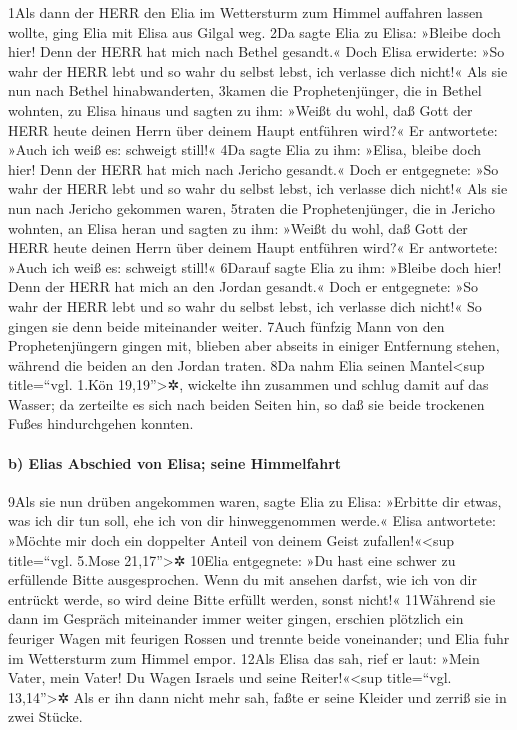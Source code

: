 1Als dann der HERR den Elia im Wettersturm zum Himmel auffahren lassen
wollte, ging Elia mit Elisa aus Gilgal weg. 2Da sagte Elia zu Elisa:
»Bleibe doch hier! Denn der HERR hat mich nach Bethel gesandt.« Doch
Elisa erwiderte: »So wahr der HERR lebt und so wahr du selbst lebst, ich
verlasse dich nicht!« Als sie nun nach Bethel hinabwanderten, 3kamen die
Prophetenjünger, die in Bethel wohnten, zu Elisa hinaus und sagten zu
ihm: »Weißt du wohl, daß Gott der HERR heute deinen Herrn über deinem
Haupt entführen wird?« Er antwortete: »Auch ich weiß es: schweigt
still!« 4Da sagte Elia zu ihm: »Elisa, bleibe doch hier! Denn der HERR
hat mich nach Jericho gesandt.« Doch er entgegnete: »So wahr der HERR
lebt und so wahr du selbst lebst, ich verlasse dich nicht!« Als sie nun
nach Jericho gekommen waren, 5traten die Prophetenjünger, die in Jericho
wohnten, an Elisa heran und sagten zu ihm: »Weißt du wohl, daß Gott der
HERR heute deinen Herrn über deinem Haupt entführen wird?« Er
antwortete: »Auch ich weiß es: schweigt still!« 6Darauf sagte Elia zu
ihm: »Bleibe doch hier! Denn der HERR hat mich an den Jordan gesandt.«
Doch er entgegnete: »So wahr der HERR lebt und so wahr du selbst lebst,
ich verlasse dich nicht!« So gingen sie denn beide miteinander weiter.
7Auch fünfzig Mann von den Prophetenjüngern gingen mit, blieben aber
abseits in einiger Entfernung stehen, während die beiden an den Jordan
traten. 8Da nahm Elia seinen Mantel\textless sup title=``vgl. 1.Kön
19,19''\textgreater✲, wickelte ihn zusammen und schlug damit auf das
Wasser; da zerteilte es sich nach beiden Seiten hin, so daß sie beide
trockenen Fußes hindurchgehen konnten.

\hypertarget{b-elias-abschied-von-elisa-seine-himmelfahrt}{%
\paragraph{b) Elias Abschied von Elisa; seine
Himmelfahrt}\label{b-elias-abschied-von-elisa-seine-himmelfahrt}}

9Als sie nun drüben angekommen waren, sagte Elia zu Elisa: »Erbitte dir
etwas, was ich dir tun soll, ehe ich von dir hinweggenommen werde.«
Elisa antwortete: »Möchte mir doch ein doppelter Anteil von deinem Geist
zufallen!«\textless sup title=``vgl. 5.Mose 21,17''\textgreater✲ 10Elia
entgegnete: »Du hast eine schwer zu erfüllende Bitte ausgesprochen. Wenn
du mit ansehen darfst, wie ich von dir entrückt werde, so wird deine
Bitte erfüllt werden, sonst nicht!« 11Während sie dann im Gespräch
miteinander immer weiter gingen, erschien plötzlich ein feuriger Wagen
mit feurigen Rossen und trennte beide voneinander; und Elia fuhr im
Wettersturm zum Himmel empor. 12Als Elisa das sah, rief er laut: »Mein
Vater, mein Vater! Du Wagen Israels und seine Reiter!«\textless sup
title=``vgl. 13,14''\textgreater✲ Als er ihn dann nicht mehr sah, faßte
er seine Kleider und zerriß sie in zwei Stücke.

